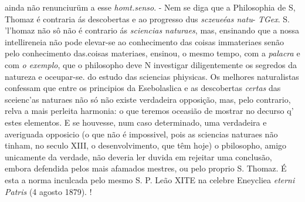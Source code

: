 ainda não renunciurüm a esse \emph{homt.senso}. - Nem se diga que a Philosophia de S, Thomaz é contraria ás descobertas e ao progresso dus \emph{sczeueéas natu}- \emph{TGex}. S. 'l'homaz não sô não é contrario ás \emph{sciencias naturaes}, mas, ensinando que a nossa intellireneia não pode elevar-se ao conhecimento das coisas immateriaes senão pelo conhecimento das.coisas materiaes, ensinou, o mesmo tempo, com a \emph{palacra} e com \emph{o exemplo}, que o philosopho deve N investigar diligentemente os segredos da natureza e oceupar-se. do estudo das sciencias phiysicas. Os melhores naturalistas confessam que entre os principios da Esebolaslica e as descobertas \emph{certas} das sceienc'as naturaes não só não existe verdadeira opposição, mas, pelo contrario, relva a mais perleita harmonia: o que teremos oceasião de mostrar no decurso q' estes elementos. E se houvesse, num caso determinado, uma verdadeira e averiguada opposicio (o que não é impossivel, pois as sciencias naturaes não tinham, no seculo XIII, o desenvolvimento, que têm hoje) o pbilosopho, amigo unicamente da verdade, não deveria ler duvida em rejeitar uma conclusão, embora defendida pelos mais afamados mestres, ou pelo proprio S. Thomaz. É esta a norma inculcada pelo mesmo S. P. Leão XITE na celebre Eneycliea \emph{eterni Patris} (4 agosto 1879). !

